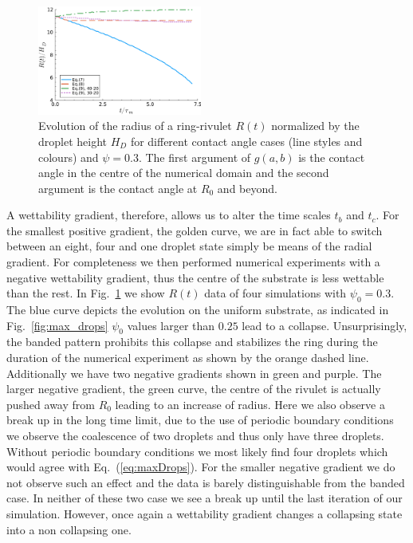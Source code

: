 \documentclass[twoside,twocolumn,9pt]{article}
\begin{document}
\begin{figure}
    \centering
    \includegraphics[width=0.48\textwidth]{assets/radius_time_gradient_positive.pdf}
    \caption{Evolution of the radius of a ring-rivulet $R(t)$ normalized by the droplet height $H_D$ for different contact angle cases (line styles and colours) and $\psi = 0.3$.
    The first argument of $g(a,b)$ is the contact angle in the centre of the numerical domain and the second argument is the contact angle at $R_0$ and beyond.}
    \label{fig:positivewetgrad}
\end{figure}
A wettability gradient, therefore, allows us to alter the time scales $t_b$ and $t_c$.
For the smallest positive gradient, the golden curve, we are in fact able to switch between an eight, four and one droplet state simply be means of the radial gradient. 
For completeness we then performed numerical experiments with a negative wettability gradient, thus the centre of the substrate is less wettable than the rest.
In Fig.~\ref{fig:positivewetgrad} we show $R(t)$ data of four simulations with $\psi_0 = 0.3$.
The blue curve depicts the evolution on the uniform substrate, as indicated in Fig.~\ref{fig:max_drops} $\psi_0$ values larger than $0.25$ lead to a collapse.
Unsurprisingly, the banded pattern prohibits this collapse and stabilizes the ring during the duration of the numerical experiment as shown by the orange dashed line.
Additionally we have two negative gradients shown in green and purple. 
The larger negative gradient, the green curve, the centre of the rivulet is actually pushed away from $R_0$ leading to an increase of radius.
Here we also observe a break up in the long time limit, due to the use of periodic boundary conditions we observe the coalescence of two droplets and thus only have three droplets.
Without periodic boundary conditions we most likely find four droplets which would agree with Eq.~(\ref{eq:maxDrops}).
For the smaller negative gradient we do not observe such an effect and the data is barely distinguishable from the banded case.
In neither of these two case we see a break up until the last iteration of our simulation.
However, once again a wettability gradient changes a collapsing state into a non collapsing one.
\end{document}
